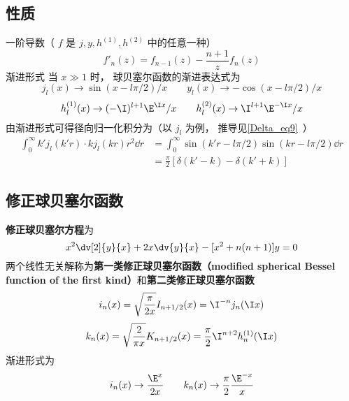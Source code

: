 \subsection{性质}
一阶导数（ $f$ 是 $j, y, h^{(1)}, h^{(2)}$ 中的任意一种）
\begin{equation}
f'_n(z) = f_{n-1}(z) - \frac{n+1}{z} f_n(z)
\end{equation}
渐进形式
当 $x \gg 1$ 时， 球贝塞尔函数的渐进表达式为
\begin{equation}\label{SphBsl_eq2}
j_l(x) \to \sin(x - l\pi /2)/x
\qquad
y_l(x) \to  - \cos(x - l\pi /2)/x
\end{equation}
\begin{equation}
h_l^{(1)}(x) \to ( -\I)^{l+1} \E^{\I x}/x
\qquad
h_l^{(2)}(x) \to \I^{l + 1} \E^{-\I x}/x
\end{equation}
由渐进形式可得径向归一化积分为（以 $j_l$ 为例， 推导见\autoref{Delta_eq9}~）
\begin{equation}
\begin{aligned}
\int_0^\infty k'j_l(k'r) \cdot kj_l(kr) r^2 \dd{r} &= \int_0^\infty \sin(k'r - l\pi/2)\sin(kr - l\pi/2) \dd{r}\\
& = \frac{\pi}{2}[\delta(k'-k) - \delta(k'+k)]
\end{aligned}
\end{equation}

\subsection{修正球贝塞尔函数}

\textbf{修正球贝塞尔方程}为
\begin{equation}
x^2 \dv[2]{y}{x} + 2x\dv{y}{x} - [x^2 + n(n + 1)]y = 0
\end{equation}
两个线性无关解称为\textbf{第一类修正球贝塞尔函数（modified spherical Bessel function of the first kind）}和\textbf{第二类修正球贝塞尔函数}
\begin{equation}
i_n(x) = \sqrt{\frac{\pi }{2x}} I_{n+1/2}(x) = \I^{-n} j_n(\I x)
\end{equation}
\begin{equation}\label{SphBsl_eq1}
k_n(x) = \sqrt{\frac{2}{\pi x}} K_{n+1/2}(x) = \frac{\pi }{2} \I^{n + 2} h_n^{(1)}(\I x)
\end{equation}
渐进形式为
\begin{equation}
i_n(x) \to \frac{\E^x}{2x}
\qquad
k_n(x) \to \frac{\pi}{2} \frac{\E^{-x}}{x}
\end{equation}
